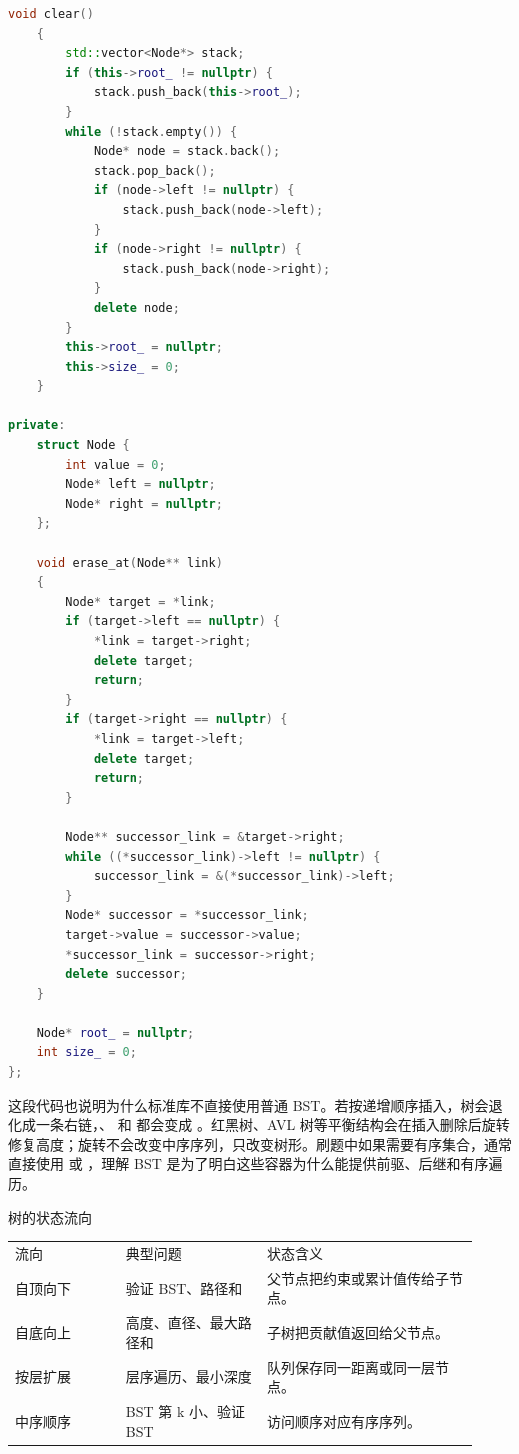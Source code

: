 \begin{lstlisting}[language=C++,caption={二叉搜索树完整实现：插入、查找、删除和中序遍历}]
    void clear()
    {
        std::vector<Node*> stack;
        if (this->root_ != nullptr) {
            stack.push_back(this->root_);
        }
        while (!stack.empty()) {
            Node* node = stack.back();
            stack.pop_back();
            if (node->left != nullptr) {
                stack.push_back(node->left);
            }
            if (node->right != nullptr) {
                stack.push_back(node->right);
            }
            delete node;
        }
        this->root_ = nullptr;
        this->size_ = 0;
    }

private:
    struct Node {
        int value = 0;
        Node* left = nullptr;
        Node* right = nullptr;
    };

    void erase_at(Node** link)
    {
        Node* target = *link;
        if (target->left == nullptr) {
            *link = target->right;
            delete target;
            return;
        }
        if (target->right == nullptr) {
            *link = target->left;
            delete target;
            return;
        }

        Node** successor_link = &target->right;
        while ((*successor_link)->left != nullptr) {
            successor_link = &(*successor_link)->left;
        }
        Node* successor = *successor_link;
        target->value = successor->value;
        *successor_link = successor->right;
        delete successor;
    }

    Node* root_ = nullptr;
    int size_ = 0;
};
\end{lstlisting}

这段代码也说明为什么标准库不直接使用普通 BST。若按递增顺序插入，树会退化成一条右链，、 和  都会变成 。红黑树、AVL 树等平衡结构会在插入删除后旋转修复高度；旋转不会改变中序序列，只改变树形。刷题中如果需要有序集合，通常直接使用  或 ，理解 BST 是为了明白这些容器为什么能提供前驱、后继和有序遍历。

\begin{principlebox}{树的状态流向}
\begin{tabular}{@{}p{0.22\linewidth}p{0.28\linewidth}p{0.42\linewidth}@{}}
流向 & 典型问题 & 状态含义\\
自顶向下 & 验证 BST、路径和 & 父节点把约束或累计值传给子节点。\\
自底向上 & 高度、直径、最大路径和 & 子树把贡献值返回给父节点。\\
按层扩展 & 层序遍历、最小深度 & 队列保存同一距离或同一层节点。\\
中序顺序 & BST 第 k 小、验证 BST & 访问顺序对应有序序列。\\
\end{tabular}
\end{principlebox}

